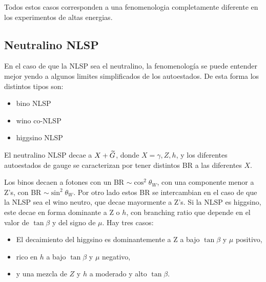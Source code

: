 Todos estos casos corresponden a una fenomenologia completamente diferente en
los experimentos de altas energias.

\subsection{Neutralino NLSP}

En el caso de que la NLSP sea el neutralino, la fenomenología se puede entender
mejor yendo a algunos limites simplificados de los autoestados. De esta forma
los distintos tipos son:

\begin{itemize}
\item bino NLSP
\item wino co-NLSP
\item higgsino NLSP
\end{itemize}



El neutralino NLSP decae a $X + \widetilde{G}$, donde $X=\gamma, Z, h$, y los
diferentes autoestados de gauge se caracterizan por tener distintos
BR a las diferentes $X$.


Los binos decaen a fotones con un BR $\sim \cos^2\theta_W$, con una componente menor a Z's, con
BR $\sim \sin^2\theta_W$.
Por otro lado estos BR se intercambian en el caso de que la NLSP sea el wino neutro, que decae
mayormente a Z's.
Si la NLSP es higgsino, este decae en forma dominante a Z o $h$, con branching ratio que depende
en el valor de $\tan\beta$ y del signo de $\mu$. Hay tres casos:

\begin{itemize}
\item El decaimiento del higgsino es dominantemente a Z a bajo $\tan\beta$ y $\mu$ positivo,
\item rico en $h$ a bajo $\tan\beta$ y $\mu$ negativo,
\item y una mezcla de $Z$ y $h$ a moderado y alto $\tan\beta$.
\end{itemize}

